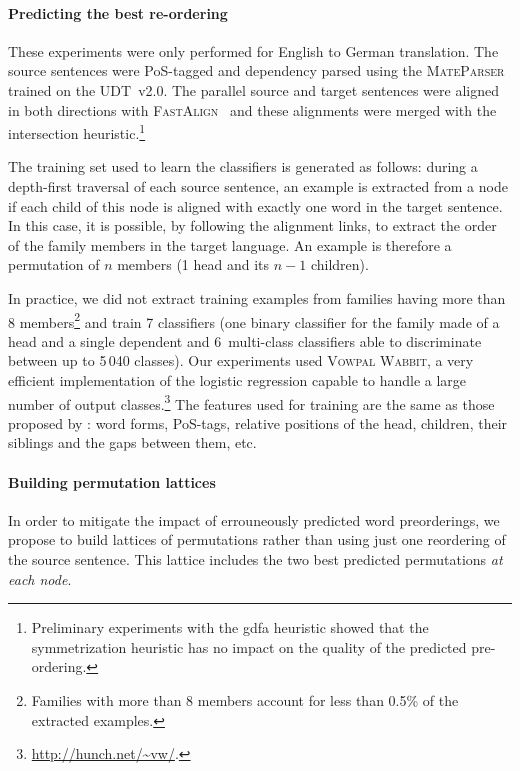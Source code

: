 \documentclass[11pt]{article}
\begin{document}

\paragraph{Predicting the best re-ordering} These experiments were
only performed for English to German translation.  The source
sentences were PoS-tagged and dependency parsed using the
\textsc{MateParser}~\cite{bohnet12joint} trained on the UDT~v2.0. The
parallel source and target sentences were aligned in both directions
with \textsc{FastAlign}~\cite{Dyer13asimple} and these alignments were
merged with the intersection heuristic.\footnote{Preliminary
  experiments with the gdfa heuristic showed that the symmetrization
  heuristic has no impact on the quality of the predicted
  pre-ordering.}

The training set used to learn the classifiers is generated as follows:
during a depth-first traversal of each source sentence, an example is extracted from a node
if each child of this node is aligned with exactly one word in the
target sentence. In this case, it is possible, by following the
alignment links, to extract the order of the family members in the
target language. An example is therefore a permutation of $n$ members
(1 head and its $n-1$ children).

In practice, we did not extract training examples from families having
more than 8 members\footnote{Families with more than 8 members account
  for less than 0.5\% of the extracted examples.} and train 7
classifiers (one binary classifier for the family made of a head and a
single dependent and 6~multi-class classifiers able to discriminate
between up to 5\,040 classes). Our experiments used
\textsc{Vowpal Wabbit}, a very efficient implementation of the logistic
regression capable to handle a large number of output
classes.\footnote{\url{http://hunch.net/~vw/}.} The features used for
training are the same as those proposed by \cite{lerner2013source}:
word forms, PoS-tags, relative positions of the head, children, their
siblings and the gaps between them, etc.

\paragraph{Building permutation lattices}

In order to mitigate the impact of errouneously predicted word preorderings, we propose to build
lattices of permutations rather than using just one reordering
of the source sentence. This lattice includes the two best predicted permutations
\emph{at each node}.
\end{document}
